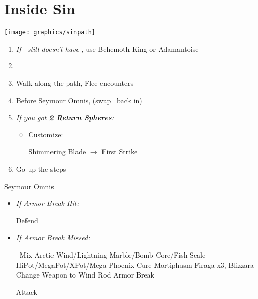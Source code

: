 \chapter{Inside Sin}
\texttt{[image: graphics/sinpath]}
\begin{enumerate}
    \item \textit{If \rikku\ still doesn't have \od} \formation{\tidus}{\auron}{\rikku}, use Behemoth King or Adamantoise
    \item \formation{\tidus}{\auron}{\kimahri}
    \item Walk along the path, Flee encounters
    \item Before Seymour Omnis, \formation{\tidus}{\auron}{\yuna} (swap \yuna\ back in)
    \item \textit{If you got \textbf{2 Return Spheres}:}
    \begin{itemize}
        \item Customize:
        \begin{itemize}
            \auronf Shimmering Blade $\rightarrow$ First Strike
        \end{itemize}
    \end{itemize}
    \item Go up the steps
\end{enumerate}
\begin{battle}[80000]{Seymour Omnis}
    \begin{itemize}
        \yunaf Defend
        \tidusf Armor Break
        \item \textit{If Armor Break Hit:}
        \begin{itemize}
            \auronf Defend
        \end{itemize}
        \item \textit{If Armor Break Missed:}
        \begin{itemize}
            \switch{\auron}{\rikku}
            \rikkuf \od\ Mix Arctic Wind/Lightning Marble/Bomb Core/Fish Scale + HiPot/MegaPot/XPot/Mega Phoenix
            \yunaf Cure Mortiphasm
            \enemyf Firaga x3, Blizzara
            \yunaf Change Weapon to Wind Rod
            \tidusf Armor Break
        \end{itemize}
        \summon{\bahamut}
        \bahamutf Attack
    \end{itemize}
\end{battle}
